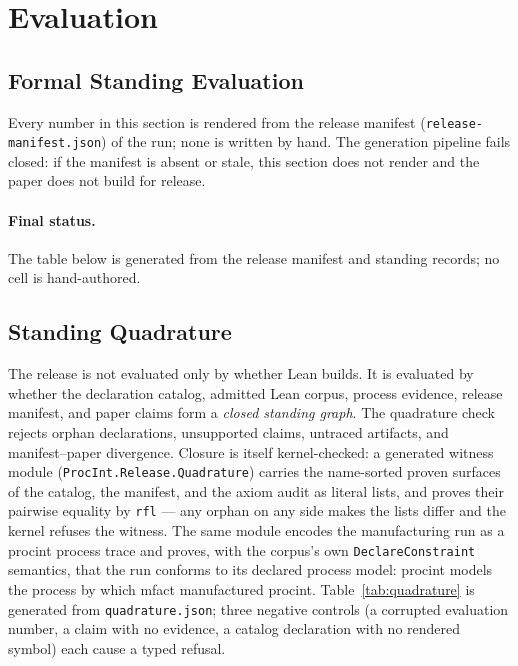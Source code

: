 \documentclass[11pt]{article}
\newif\ifreleasebuild
\begin{document}
\section{Evaluation}
\label{sec:eval}

\subsection{Formal Standing Evaluation}
\label{sec:formal_eval}

Every number in this section is rendered from the release manifest
(\texttt{release-manifest.json}) of the run; none is written by hand. The
generation pipeline fails closed: if the manifest is absent or stale, this
section does not render and the paper does not build for release.

\ifreleasebuild
  
\else
\fi

\paragraph{Final status.} The table below is generated from the
release manifest and standing records; no cell is hand-authored.
\ifreleasebuild
  
\else
\fi

\subsection{Standing Quadrature}
\label{sec:quadrature}

The release is not evaluated only by whether Lean builds. It is evaluated
by whether the declaration catalog, admitted Lean corpus, process
evidence, release manifest, and paper claims form a \emph{closed standing
graph}. The quadrature check rejects orphan declarations, unsupported
claims, untraced artifacts, and manifest--paper divergence. Closure is
itself kernel-checked: a generated witness module
(\texttt{ProcInt.Release.Quadrature}) carries the name-sorted proven
surfaces of the catalog, the manifest, and the axiom audit as literal
lists, and proves their pairwise equality by \texttt{rfl} --- any orphan
on any side makes the lists differ and the kernel refuses the witness.
The same module encodes the manufacturing run as a \textsf{procint}
process trace and proves, with the corpus's own \texttt{DeclareConstraint}
semantics, that the run conforms to its declared process model:
\textsf{procint} models the process by which \textsf{mfact} manufactured
\textsf{procint}. Table~\ref{tab:quadrature} is generated from
\texttt{quadrature.json}; three negative controls (a corrupted evaluation
number, a claim with no evidence, a catalog declaration with no rendered
symbol) each cause a typed refusal.
\end{document}
